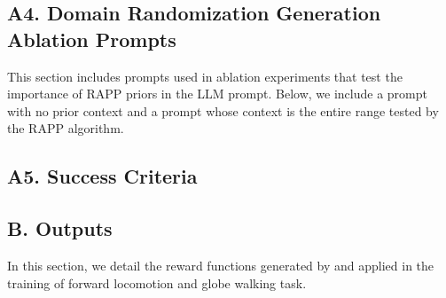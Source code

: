 \documentclass[conference]{IEEEtran}
\begin{document}
\subsection*{A4. Domain Randomization Generation Ablation Prompts}
This section includes prompts used in ablation experiments that test the importance of RAPP priors in the LLM prompt. Below, we include a prompt with no prior context and a prompt whose context is the entire range tested by the RAPP algorithm.






\subsection*{A5. Success Criteria}
\begin{table}[H]
\centering
{}
  \caption{\textbf{Success criteria for our tasks.} $v_x$ and $v_x^t$ are forward velocity and target velocity, respectively. $\omega_z$ is the angular velocity of the cube. The success criteria is summed over all steps within an episode.}
  \label{table:success-criteria}
\end{table}


\subsection*{B. \ourmethod Outputs}
\label{appendix:outputs}
\lstset{style=pythonstyle}
In this section, we detail the reward functions generated by \ourmethod and applied in the training of forward locomotion and globe walking task.
\end{document}

